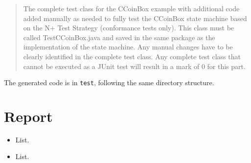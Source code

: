 \documentclass[ieee]{submit}
\begin{document}
\begin{quote}
The complete test class for the CCoinBox example with additional code added manually as
needed to fully test the CCoinBox state machine based on the N+ Test Strategy (conformance tests only). This class must be called TestCCoinBox.java and saved in the same package as the implementation of the state machine. Any manual changes have to be clearly identified in the
complete test class. Any complete test class that cannot be executed as a JUnit test will result in a mark of 0 for this part.
\end{quote}

The generated code is in {\tt test}, following the same directory structure.

\section{Report}



\begin{itemize}
\item List.
\item List.
\end{itemize}
\end{document}

